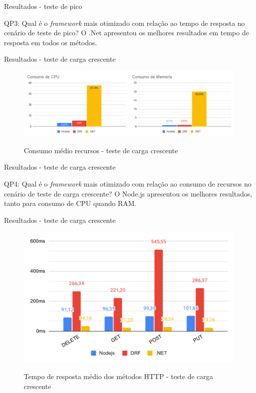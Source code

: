 \documentclass{libs/ufc_format}
\begin{document}
\begin{frame}{Resultados - teste de pico}
    \begin{block}{QP3: Qual é o \textit{framework} mais otimizado com relação ao tempo de resposta no cenário de teste de pico?}
        O .Net apresentou os melhores resultados em tempo de resposta em todos os métodos.
    \end{block}
\end{frame}


\begin{frame}{Resultados - teste de carga crescente}
    \begin{figure}[H]
        \centering
        \caption{Consumo médio recursos - teste de carga crescente}
        \includegraphics[width=1\linewidth]{figuras/resultados/consumo-recursos-crescente.pdf}
        \captionsetup{justification=centering}
        \label{fig:recursos-crescente}
    \end{figure}
\end{frame}

\begin{frame}{Resultados - teste de carga crescente}
    \begin{block}{QP4: Qual é o \textit{framework} mais otimizado com relação ao consumo de recursos no cenário de teste de carga crescente?}
        O Node.js apresentou os melhores resultados, tanto para consumo de CPU quando RAM.
    \end{block}
\end{frame}

\begin{frame}{Resultados - teste de carga crescente}
    \begin{figure}[H]
        \centering
        \caption{Tempo de resposta médio dos métodos HTTP - teste de carga crescente}
        \includegraphics[width=0.9\linewidth]{figuras/resultados/crescente-tempo-metodos-totais3.pdf}
        \captionsetup{justification=centering}
        \label{fig:crescente-tempo-metodos-totais}
    \end{figure}
\end{frame}
\end{document}
